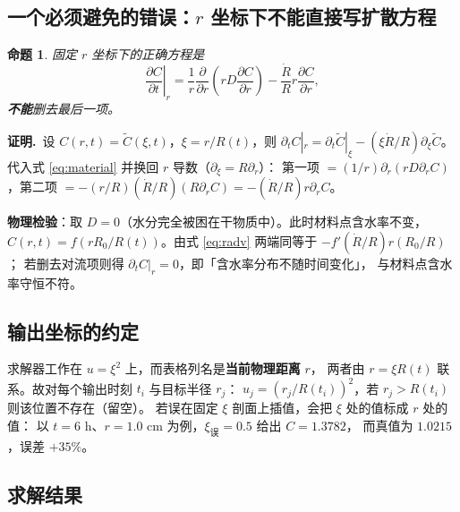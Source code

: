 \documentclass[bwprint]{cumcmthesis}
\newtheorem{proposition}{命题}
\begin{document}
\subsection{一个必须避免的错误：$r$ 坐标下不能直接写扩散方程}

\begin{proposition}
固定 $r$ 坐标下的正确方程是
\begin{equation}
\left.\frac{\partial C}{\partial t}\right|_r
=\frac{1}{r}\frac{\partial}{\partial r}\left(rD\frac{\partial C}{\partial r}\right)
-\frac{\dot R}{R}r\frac{\partial C}{\partial r},
\label{eq:radv}
\end{equation}
\textbf{不能}删去最后一项。
\end{proposition}
\noindent\textbf{证明.}\ 
设 $C(r,t)=\tilde C(\xi,t)$，$\xi=r/R(t)$，则
$\partial_tC|_r=\partial_t\tilde C|_\xi-(\xi\dot R/R)\partial_\xi\tilde C$。
代入式 \eqref{eq:material} 并换回 $r$ 导数（$\partial_\xi=R\partial_r$）：
第一项 $=(1/r)\partial_r(rD\partial_rC)$，第二项
$=-(r/R)(\dot R/R)(R\partial_rC)=-(\dot R/R)r\partial_rC$。

\textbf{物理检验}：取 $D=0$（水分完全被困在干物质中）。此时材料点含水率不变，
$C(r,t)=f(rR_0/R(t))$。由式 \eqref{eq:radv} 两端同等于 $-f'(\dot R/R)r(R_0/R)$；
若删去对流项则得 $\partial_tC|_r=0$，即「含水率分布不随时间变化」，
与材料点含水率守恒不符。

\subsection{输出坐标的约定}

求解器工作在 $u=\xi^2$ 上，而表格列名是\textbf{当前物理距离} $r$，
两者由 $r=\xi R(t)$ 联系。故对每个输出时刻 $t_i$ 与目标半径 $r_j$：
$u_j=(r_j/R(t_i))^2$，若 $r_j>R(t_i)$ 则该位置不存在（留空）。
若误在固定 $\xi$ 剖面上插值，会把 $\xi$ 处的值标成 $r$ 处的值：
以 $t=6$ h、$r=1.0$ cm 为例，$\xi_{\text{误}}=0.5$ 给出 $C=1.3782$，
而真值为 $1.0215$，误差 $+35\%$。

\subsection{求解结果}
\end{document}
